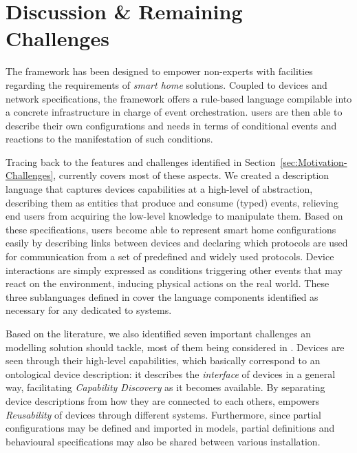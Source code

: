 \section{Discussion \& Remaining Challenges}
\label{sec:Discussion}

The \IOTDSL framework has been designed to empower non-experts with facilities regarding the requirements of \textit{smart home} \IOT solutions. Coupled to \IOT devices and network specifications, the framework offers a rule-based language compilable into a concrete \CEP infrastructure in charge of event orchestration. \IOTDSL users are then able to describe their own configurations and needs in terms of conditional events and reactions to the manifestation of such conditions.

Tracing back to the features and challenges identified in Section~\ref{sec:Motivation-Challenges}, \IOTDSL currently covers most of these aspects. We created a description language that captures devices capabilities at a high-level of abstraction, describing them as entities that produce and consume (typed) events, relieving end users from acquiring the low-level knowledge to manipulate them. Based on these specifications, users become able to represent smart home configurations easily by describing links between devices and declaring which protocols are used for communication from a set of predefined and widely used protocols. Device interactions are simply expressed as conditions triggering other events that may react on the environment, inducing physical actions on the real world. These three sublanguages defined in \IOTDSL cover the language components identified as necessary for any \DSL dedicated to \IOT systems.

Based on the literature, we also identified seven important challenges an \IOT modelling solution should tackle, most of them being considered in \IOTDSL. Devices are seen through their high-level capabilities, which basically correspond to an ontological device description: it describes the \emph{interface} of devices in a general way, facilitating \emph{Capability Discovery} as it becomes available. By separating device descriptions from how they are connected to each others, \IOTDSL empowers \emph{Reusability} of devices through different \IOT systems. Furthermore, since partial configurations may be defined and imported in \IOTDSL models, partial definitions and behavioural specifications may also be shared between various installation.


